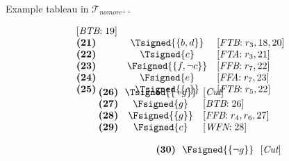 \begin{frame}{Example tableau in $\mathcal{T}_{\textit{nomore}^{++}}$}
\begin{center}
\begin{minipage}[t]{16cm}
\begin{minipage}[t]{6cm}
\[\begin{array}{lcl}
  [\textit{BTB}{:}\;\text{19}]                     \\
\textbf{(21)}                                      &
  \Tsigned{\{b,d\}}                                &
  [\textit{FTB}{:}\;r_3, \text{18}, \text{20}]     \\
\textbf{(22)}                                      &
  \Tsigned{c}                                      &
  [\textit{FTA}{:}\;r_3, \text{21}]                \\
\textbf{(23)}                                      &
  \Fsigned{\{f,\neg c\}}                   &
  [\textit{FFB}{:}\;r_7, \text{22}]                \\
\textbf{(24)}                                      &
  \Fsigned{e}                                      &
  [\textit{FFA}{:}\;r_7, \text{23}]                \\
\textbf{(25)}                                      &
  \Tsigned{\{c\}}                                  &
  [\textit{FTB}{:}\;r_5, \text{22}]
\vspace{-0.7cm}
\end{array}
\]
%
\begin{minipage}[t]{1cm}
\[
\hspace{0.25cm}
\begin{array}{l@{~~}c@{~~}l}
\textbf{(26)}                                      &
  \Tsigned{\{\neg g\}}                     &
  [\textit{Cut}]                                   \\
\textbf{(27)}                                      &
  \Fsigned{g}                                      &
  [\textit{BTB}{:}\;\text{26}]                     \\
\textbf{(28)}                                      & \hspace{-0.1cm}
  \Fsigned{\{g\}}                                  \hspace{-0.1cm} &
  [\textit{FFB}{:}\;r_4, r_6, \text{27}]           \\
\textbf{(29)}                                      &
  \Fsigned{c}                                      &
  [\textit{WFN}{:}\;\text{28}]
\end{array}
\]
\end{minipage}
%
\begin{minipage}[t]{2cm}
\[
\hspace{2.75cm}
\begin{array}{l@{~~}c@{~~}l}
\textbf{(30)}                                      &
  \Fsigned{\{\neg g\}}                     &
  [\textit{Cut}]                                   \\

\end{array}\]
\end{minipage}
\end{minipage}
\end{minipage}
\end{center}
\end{frame}
